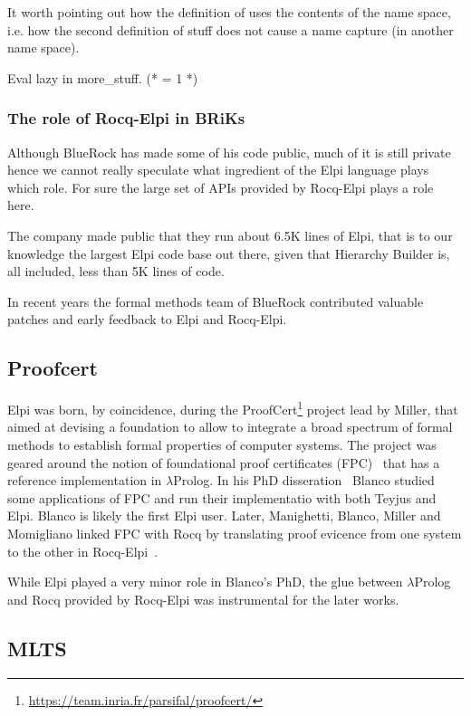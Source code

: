 \documentclass[a4paper, 11pt]{book}
\begin{document}
It worth pointing out how the definition of 
uses the contents of the name space, i.e. how the second definition
of stuff does not cause a name capture (in another name space).

\begin{rocqcode}
Eval lazy in more_stuff. (* = 1 *)
\end{rocqcode}

\subsubsection{The role of Rocq-Elpi in BRiKs}

Although BlueRock has made some of his code public, much of it is still
private hence we cannot really speculate what ingredient of the Elpi
language plays which role. For sure the large set of APIs provided by
Rocq-Elpi plays a role here.

The company made public that they run about 6.5K lines of Elpi, that is
to our knowledge the largest Elpi code base out there, given that Hierarchy
Builder is, all included, less than 5K lines of code.

In recent years the formal methods team of BlueRock contributed valuable
patches and early feedback to Elpi and Rocq-Elpi.  

\subsection{Proofcert}

Elpi was born, by coincidence, during the
ProofCert\footnote{\url{https://team.inria.fr/parsifal/proofcert/}}
project lead by Miller, that aimed at devising a foundation to allow to
integrate a broad spectrum of formal methods to establish formal
properties of computer systems. The project was geared around the
notion of foundational proof certificates (FPC)~\cite{Marek_2016}
that has a reference implementation in $\lambda$Prolog.
In his PhD disseration~\cite{rob} Blanco studied some
applications of FPC and run their implementatio with both Teyjus and Elpi.
Blanco is likely the first Elpi user. Later, Manighetti, Blanco,
Miller and Momigliano linked FPC with Rocq by translating proof
evicence from one system to the other in Rocq-Elpi~\cite{matteo,alberto}.

While Elpi played a very minor role in Blanco's PhD, the glue
between $\lambda$Prolog and Rocq provided by Rocq-Elpi was instrumental
for the later works.

\subsection{MLTS}
\end{document}
